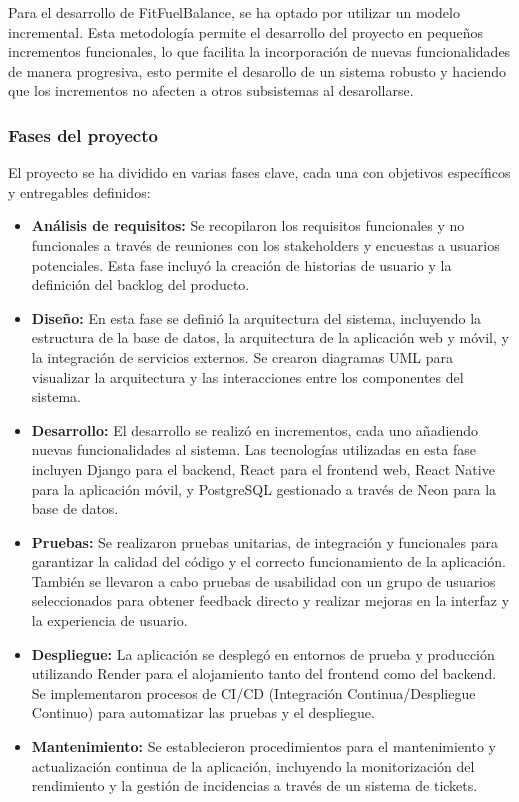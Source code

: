 Para el desarrollo de FitFuelBalance, se ha optado por utilizar un modelo incremental. Esta metodología permite el desarrollo del proyecto en pequeños incrementos funcionales, lo que facilita la incorporación de nuevas funcionalidades de manera progresiva, esto permite el desarollo de un sistema robusto y haciendo que los incrementos no afecten a otros subsistemas al desarollarse.

\subsubsection{Fases del proyecto}

El proyecto se ha dividido en varias fases clave, cada una con objetivos específicos y entregables definidos:

\begin{itemize}
    \item \textbf{Análisis de requisitos:} Se recopilaron los requisitos funcionales y no funcionales a través de reuniones con los stakeholders y encuestas a usuarios potenciales. Esta fase incluyó la creación de historias de usuario y la definición del backlog del producto.

    \item \textbf{Diseño:} En esta fase se definió la arquitectura del sistema, incluyendo la estructura de la base de datos, la arquitectura de la aplicación web y móvil, y la integración de servicios externos. Se crearon diagramas UML para visualizar la arquitectura y las interacciones entre los componentes del sistema.

    \item \textbf{Desarrollo:} El desarrollo se realizó en incrementos, cada uno añadiendo nuevas funcionalidades al sistema. Las tecnologías utilizadas en esta fase incluyen Django para el backend, React para el frontend web, React Native para la aplicación móvil, y PostgreSQL gestionado a través de Neon para la base de datos.

    \item \textbf{Pruebas:} Se realizaron pruebas unitarias, de integración y funcionales para garantizar la calidad del código y el correcto funcionamiento de la aplicación. También se llevaron a cabo pruebas de usabilidad con un grupo de usuarios seleccionados para obtener feedback directo y realizar mejoras en la interfaz y la experiencia de usuario.

    \item \textbf{Despliegue:} La aplicación se desplegó en entornos de prueba y producción utilizando Render para el alojamiento tanto del frontend como del backend. Se implementaron procesos de CI/CD (Integración Continua/Despliegue Continuo) para automatizar las pruebas y el despliegue.

    \item \textbf{Mantenimiento:} Se establecieron procedimientos para el mantenimiento y actualización continua de la aplicación, incluyendo la monitorización del rendimiento y la gestión de incidencias a través de un sistema de tickets.

\end{itemize}

